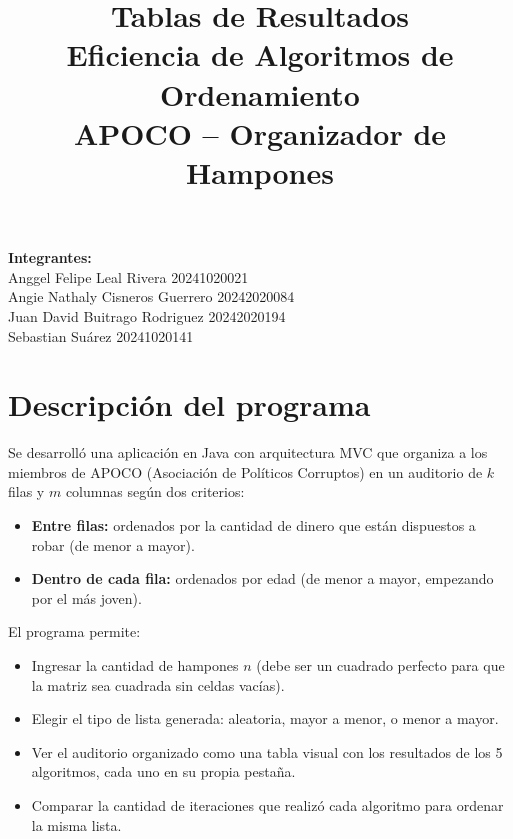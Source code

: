 \documentclass[12pt]{article}
\title{\textbf{Tablas de Resultados}\\
Eficiencia de Algoritmos de Ordenamiento\\
APOCO -- Organizador de Hampones}
\date{}
\begin{document}
\maketitle

\begin{center}
  {\large \textbf{Integrantes:}}\\
  
  Anggel Felipe Leal Rivera 20241020021\\
Angie Nathaly Cisneros Guerrero 20242020084\\
Juan David Buitrago Rodriguez 20242020194\\
Sebastian Suárez 20241020141\\

\end{center}

\section*{Descripción del programa}

Se desarrolló una aplicación en Java con arquitectura MVC que organiza a los miembros de APOCO (Asociación de Políticos Corruptos) en un auditorio de $k$ filas y $m$ columnas según dos criterios:

\begin{itemize}
    \item \textbf{Entre filas:} ordenados por la cantidad de dinero que están dispuestos a robar (de menor a mayor).
    \item \textbf{Dentro de cada fila:} ordenados por edad (de menor a mayor, empezando por el más joven).
\end{itemize}

El programa permite:
\begin{itemize}
    \item Ingresar la cantidad de hampones $n$ (debe ser un cuadrado perfecto para que la matriz sea cuadrada sin celdas vacías).
    \item Elegir el tipo de lista generada: aleatoria, mayor a menor, o menor a mayor.
    \item Ver el auditorio organizado como una tabla visual con los resultados de los 5 algoritmos, cada uno en su propia pestaña.
    \item Comparar la cantidad de iteraciones que realizó cada algoritmo para ordenar la misma lista.
\end{itemize}
\end{document}

